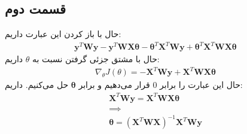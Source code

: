 \documentclass[]{article}
\begin{document}
\subsection*{قسمت دوم}
حال با باز کردن این عبارت داریم:
\begin{gather*}
    \mathbf{y}^T \mathbf{W} \mathbf{y} - \mathbf{y}^T \mathbf{W} \mathbf{X} \mathbf{\theta} - \mathbf{\theta}^T \mathbf{X} ^T \mathbf{W} \mathbf{y} + \mathbf{\theta}^T \mathbf{X}^T \mathbf{W} \mathbf{X} \mathbf{\theta}
\end{gather*}
حال با مشتق جزئی گرفتن نسبت به $\theta$ داریم:
\begin{gather*}
    \nabla_\theta J(\theta) = - \mathbf{X}^T \mathbf{W} \mathbf{y} + \mathbf{X}^T \mathbf{W} \mathbf{X} \mathbf{\theta}
\end{gather*}
حال این عبارت را برابر 0 قرار می‌دهیم و برابر
$\mathbf{\theta}$
حل می‌کنیم. داریم:
\begin{gather*}
    \mathbf{X}^T \mathbf{W} \mathbf{y} = \mathbf{X}^T \mathbf{W} \mathbf{X} \mathbf{\theta}\\
    \implies\\
    \mathbf{\theta} = (\mathbf{X}^T \mathbf{W} \mathbf{X})^{-1} \mathbf{X}^T \mathbf{W} \mathbf{y}
\end{gather*}
\end{document}
